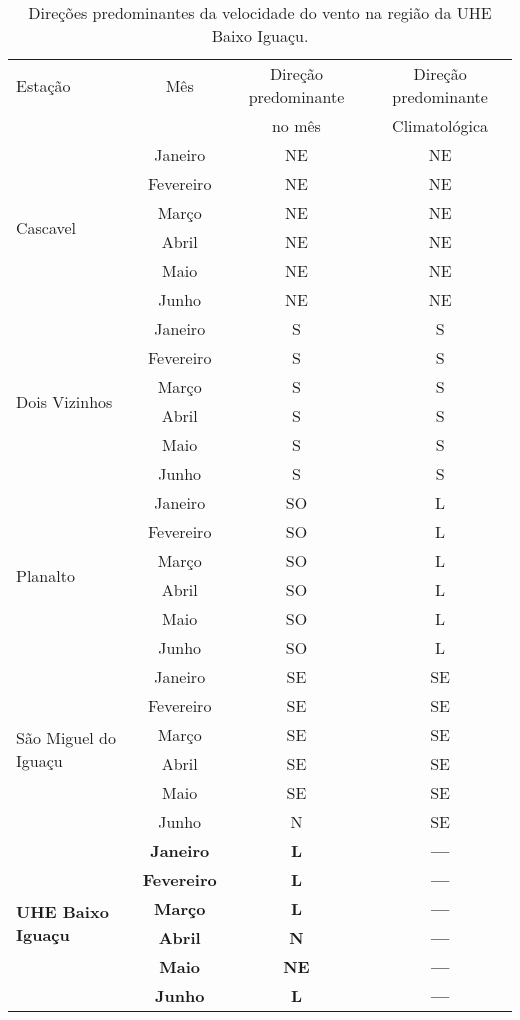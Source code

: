 \documentclass[a4paper,12pt]{article}
\begin{document}
\begin{table}[!hbt]
\begin{center}
\caption{Direções predominantes da velocidade do vento na região da UHE Baixo Iguaçu.}
\label{tab:dire}
\begin{tabular}{lccc}
\hline
Estação & Mês & Direção predominante & Direção predominante \\
        &     &      no mês          &      Climatológica   \\
\hline\multirow{6}{*}{Cascavel} & Janeiro & NE & NE \\
            & Fevereiro & NE & NE \\
            & Março & NE & NE \\
            & Abril & NE & NE \\
            & Maio & NE & NE \\
            & Junho & NE & NE \\
\hline\multirow{6}{*}{Dois Vizinhos} & Janeiro & S & S \\
            & Fevereiro & S & S \\
            & Março & S & S \\
            & Abril & S & S \\
            & Maio & S & S \\
            & Junho & S & S \\
\hline\multirow{6}{*}{Planalto} & Janeiro & SO & L \\
            & Fevereiro & SO & L \\
            & Março & SO & L \\
            & Abril & SO & L \\
            & Maio & SO & L \\
            & Junho & SO & L \\
\hline\multirow{6}{*}{São Miguel do Iguaçu} & Janeiro & SE & SE \\
            & Fevereiro & SE & SE \\
            & Março & SE & SE \\
            & Abril & SE & SE \\
            & Maio & SE & SE \\
            & Junho & N & SE \\
\hline\multirow{6}{*}{\textbf{UHE Baixo Iguaçu}} & \textbf{Janeiro} & \textbf{L} & \textbf{---} \\
            & \textbf{Fevereiro} & \textbf{L} & \textbf{{---}} \\
            & \textbf{Março} & \textbf{L} & \textbf{{---}} \\
            & \textbf{Abril} & \textbf{N} & \textbf{{---}} \\
            & \textbf{Maio} & \textbf{NE} & \textbf{{---}} \\
            & \textbf{Junho} & \textbf{L} & \textbf{{---}} \\
\hline
\end{tabular}
\end{center}
\end{table}
\end{document}

